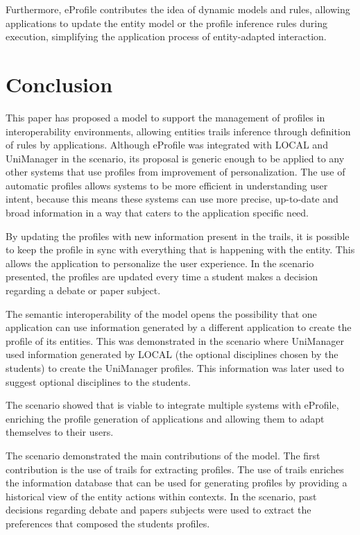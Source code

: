 \documentclass{svjour3}                     %
\begin{document}
Furthermore, eProfile contributes the idea of dynamic models and rules, allowing applications to update the entity model or the profile inference rules during execution, simplifying the application process of entity-adapted interaction.

\section{Conclusion}
\label{sec:conclusao}

This paper has proposed a model to support the management of profiles in interoperability environments, allowing entities trails inference through definition of rules by applications. Although eProfile was integrated with LOCAL and UniManager in the scenario, its proposal is generic enough to be applied to any other systems that use profiles from improvement of personalization. The use of automatic profiles allows systems to be more efficient in understanding user intent, because this means these systems can use more precise, up-to-date and broad information in a way that caters to the application specific need.

By updating the profiles with new information present in the trails, it is possible to keep the profile in sync with everything that is happening with the entity. This allows the application to personalize the user experience. In the scenario presented, the profiles are updated every time a student makes a decision regarding a debate or paper subject.

The semantic interoperability of the model opens the possibility that one application can use information generated by a different application to create the profile of its entities. This was demonstrated in the scenario where UniManager used information generated by LOCAL (the optional disciplines chosen by the students) to create the UniManager profiles. This information was later used to suggest optional disciplines to the students.

The scenario showed that is viable to integrate multiple systems with eProfile, enriching the profile generation of applications and allowing them to adapt themselves to their users. 

The scenario demonstrated the main contributions of the model. The first contribution is the use of trails for extracting profiles. The use of trails enriches the information database that can be used for generating profiles by providing a historical view of the entity actions within contexts. In the scenario, past decisions regarding debate and papers subjects were used to extract the preferences that composed the students profiles.
\end{document}
